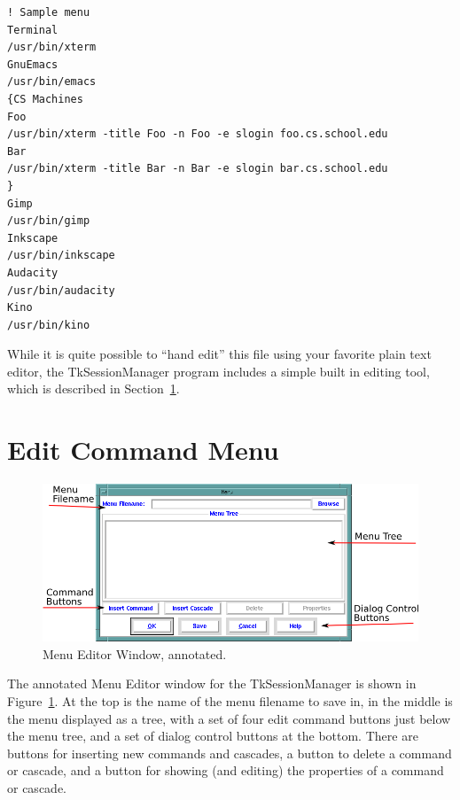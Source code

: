 \begin{lstlisting}[caption={Sample Menu},label=ref:lst:sample]
! Sample menu
Terminal
/usr/bin/xterm
GnuEmacs
/usr/bin/emacs
{CS Machines
Foo
/usr/bin/xterm -title Foo -n Foo -e slogin foo.cs.school.edu
Bar
/usr/bin/xterm -title Bar -n Bar -e slogin bar.cs.school.edu
}
Gimp
/usr/bin/gimp
Inkscape
/usr/bin/inkscape
Audacity
/usr/bin/audacity
Kino
/usr/bin/kino
\end{lstlisting}

While it is quite possible to ``hand edit'' this file using your
favorite plain text editor, the TkSessionManager program includes a
simple built in editing tool, which is described in
Section~\ref{sect:EditCommandMenu}.

\section{Edit Command Menu}
\label{sect:EditCommandMenu}

\begin{figure}[hbpt] 
\begin{centering}
\includegraphics[width=5in]{MenuEditorAnnotated.png} 
\caption{Menu Editor Window, annotated.} 
\label{ref:fig:menueditor} 
\end{centering}
\end{figure}
The annotated Menu Editor window for the TkSessionManager is shown in
Figure~\ref{ref:fig:menueditor}. At the top is the name of the menu
filename to save in, in the middle is the menu displayed as a tree,
with a set of four edit command buttons just below the menu tree, and a
set of dialog control buttons at the bottom.  There are buttons for
inserting new commands and cascades, a button to delete a command or
cascade, and a button for showing (and editing) the properties of a
command or cascade.  

